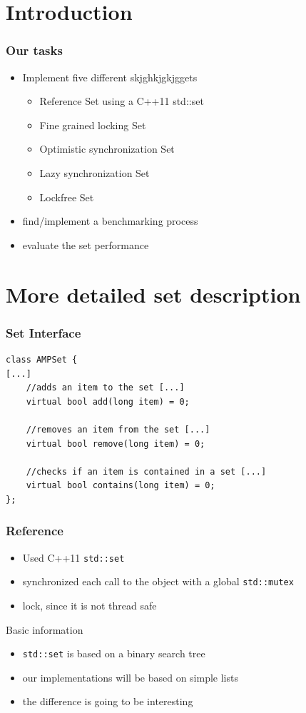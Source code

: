 \section{Introduction}

\begin{frame}
\frametitle{Our tasks}
  \begin{itemize}
  \item Implement five different skjghkjgkjggets

	\begin{itemize}
		\item Reference Set using a C++11 std::set
        \item Fine grained locking Set
        \item Optimistic synchronization Set
        \item Lazy synchronization Set
        \item Lockfree Set
	\end{itemize}
   
  \item find/implement a benchmarking process
  \item evaluate the set performance
  \end{itemize}
\end{frame}

\section{More detailed set description}

\begin{frame}[fragile] %
\frametitle{Set Interface}
\begin{lstlisting}
class AMPSet {
[...]
	//adds an item to the set [...]
	virtual bool add(long item) = 0;
	
	//removes an item from the set [...]
	virtual bool remove(long item) = 0;
	
	//checks if an item is contained in a set [...]
	virtual bool contains(long item) = 0;
};
\end{lstlisting}
\end{frame}

\begin{frame}
\frametitle{Reference}
\begin{itemize}
	\item Used C++11 \texttt{std::set}
    \item synchronized each call to the object with a global \texttt{std::mutex}
    \item lock, since it is not thread safe
\end{itemize}

Basic information
\begin{itemize}
	\item \texttt{std::set} is based on a binary search tree
    \item our implementations will be based on simple lists
    \item the difference is going to be interesting
\end{itemize}
\end{frame}

